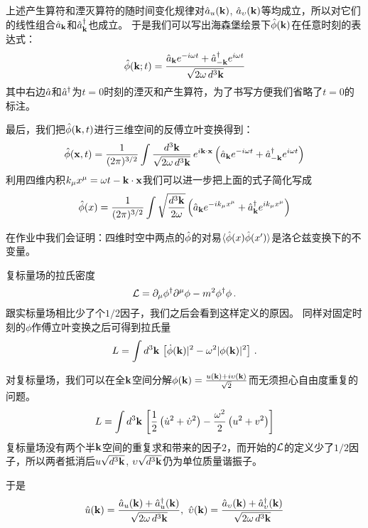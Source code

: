 \documentclass[CJK]{beamer}
\begin{document}
\begin{frame}
\bch
上述产生算符和湮灭算符的随时间变化规律对$\hat{a}_u({\mathbf{k}})$, $\hat{a}_\upsilon({\mathbf{k}})$等均成立，所以对它们的线性组合$\hat{a}_{{\mathbf{k}}}$和${\hat{a}^\dagger}_{{\mathbf{k}}}$也成立。
于是我们可以写出海森堡绘景下$\hat{\phi}({\mathbf{k}})$在任意时刻的表达式：
$$\hat{\phi}({\mathbf{k}}; t) = \frac{\hat{a}_{{\mathbf{k}}}e^{-i\omega t} +{\hat{a}^\dagger}_{-{\mathbf{k}}}e^{i\omega t}}{\sqrt{2\omega\, d^3{\mathbf{k}}}}$$
其中右边$\hat{a}$和${\hat{a}^\dagger}$为$t=0$时刻的湮灭和产生算符，为了书写方便我们省略了$t=0$的标注。
\ech
\end{frame}

\begin{frame}
\bch
最后，我们把$\hat{\phi}({\mathbf{k}}, t)$进行三维空间的反傅立叶变换得到：
$$\hat{\phi}({\mathbf{x}}, t) = \frac{1}{(2\pi)^{3/2}}\int \frac{d^3{\mathbf{k}}}{\sqrt{2\omega\, d^3{\mathbf{k}}}} \, e^{i{\mathbf{k}}\cdot{\mathbf{x}}}\left(\hat{a}_{{\mathbf{k}}}e^{-i\omega t} +{\hat{a}^\dagger}_{-{\mathbf{k}}}e^{i\omega t}\right)$$
利用四维内积$k_\mu x^\mu = \omega t - {\mathbf{k}}\cdot {\mathbf{x}}$我们可以进一步把上面的式子简化写成
$$\hat{\phi}(x) = \frac{1}{(2\pi)^{3/2}} \int \sqrt{\frac{d^3{\mathbf{k}}}{2\omega}} \left(\hat{a}_{{\mathbf{k}}} e^{-ik_\mu x^\mu} + {\hat{a}^\dagger}_{{\mathbf{k}}}e^{ik_\mu x^\mu}\right) $$

\skipline
在作业中我们会证明：四维时空中两点的$\hat{\phi}$的对易$\langle \hat{\phi}(x)\hat{\phi}(x') \rangle$是洛仑兹变换下的不变量。
\ech
\end{frame}


\begin{frame}
\bch
复标量场的拉氏密度
$${\mathcal{L}} = \partial_\mu\phi^\dagger \partial^\mu \phi - m^2\phi^\dagger\phi\, .$$
跟实标量场相比少了个$1/2$因子，我们之后会看到这样定义的原因。
\skipline
同样对固定时刻的$\phi$作傅立叶变换之后可得到拉氏量
$$L = \int d^3{\mathbf{k}} \, \left[\dot\phi({\mathbf{k}})|^2 - \omega^2|\phi({\mathbf{k}})|^2 \right]\, .$$
\ech
\end{frame}


\begin{frame}
\bch
对复标量场，我们可以在全${\mathbf{k}}$空间分解$\phi({\mathbf{k}}) = \frac{u({\mathbf{k}}) + i \upsilon({\mathbf{k}})}{\sqrt{2}}$而无须担心自由度重复的问题。
$$L = \int d^3{\mathbf{k}}\,\left[ \frac{1}{2}\left(\dot u^2 + \dot {\upsilon}^2 \right) - \frac{\omega^2}{2}\left(u^2+v^2\right)\right]$$
复标量场没有两个半${\mathbf{k}}$空间的重复求和带来的因子$2$，而开始的${\mathcal{L}}$的定义少了$1/2$因子，所以两者抵消后$u\sqrt{d^3{\mathbf{k}}}$, $\upsilon\sqrt{d^3{\mathbf{k}}}$仍为单位质量谐振子。

于是
$$\hat{u}(\veck)  = \frac{\hata_u(\veck) + \adag_u(\veck)}{\sqrt{2\omega\, d^3\veck}},\ \hat{\vel}(\veck)  = \frac{\hata_{\vel}(\veck) + \adag_{\vel}(\veck)}{\sqrt{2\omega\, d^3\veck}}$$

\ech
\end{frame}
\end{document}
